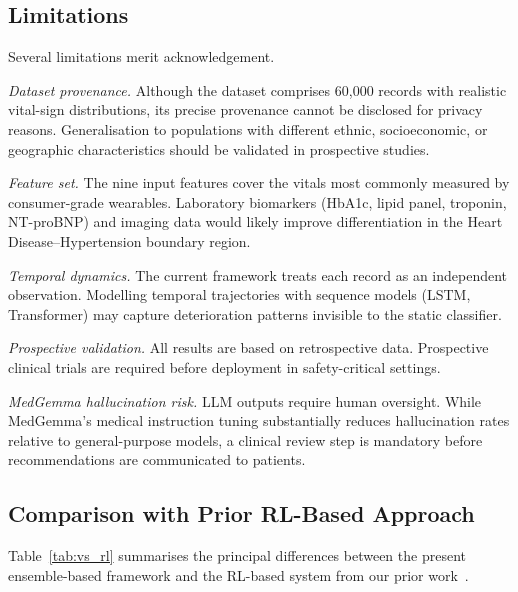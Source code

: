 \documentclass[journal]{IEEEtran}
\begin{document}
\subsection{Limitations}

Several limitations merit acknowledgement.

\textit{Dataset provenance.} Although the dataset comprises 60,000 records
with realistic vital-sign distributions, its precise provenance cannot be
disclosed for privacy reasons. Generalisation to populations with different
ethnic, socioeconomic, or geographic characteristics should be validated
in prospective studies.

\textit{Feature set.} The nine input features cover the vitals most
commonly measured by consumer-grade wearables. Laboratory biomarkers
(HbA1c, lipid panel, troponin, NT-proBNP) and imaging data would likely
improve differentiation in the Heart Disease--Hypertension boundary region.

\textit{Temporal dynamics.} The current framework treats each record as
an independent observation. Modelling temporal trajectories with sequence
models (LSTM, Transformer) may capture deterioration patterns invisible
to the static classifier.

\textit{Prospective validation.} All results are based on retrospective
data. Prospective clinical trials are required before deployment in
safety-critical settings.

\textit{MedGemma hallucination risk.} LLM outputs require human oversight.
While MedGemma's medical instruction tuning substantially reduces
hallucination rates relative to general-purpose models, a clinical review
step is mandatory before recommendations are communicated to patients.

\subsection{Comparison with Prior RL-Based Approach}

Table~\ref{tab:vs_rl} summarises the principal differences between the
present ensemble-based framework and the RL-based system from our prior
work~\cite{kunveng_iot}.
\end{document}
